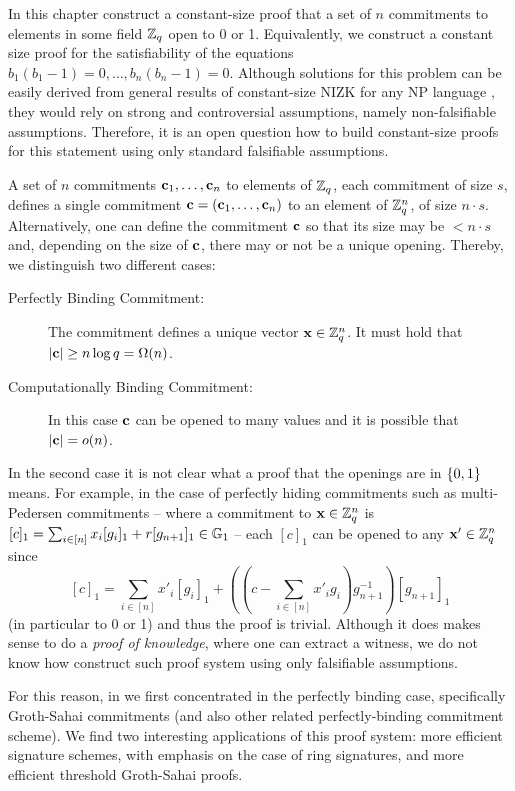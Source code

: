 In this chapter construct a {constant-size proof} that a set of $n$ commitments to elements in some field $\mathbb{Z}_q$ open to 0 or 1. Equivalently, we construct a constant size proof for the satisfiability of the equations $b_1(b_1-1)=0,\ldots,b_n(b_n-1)=0$.
Although solutions for this problem can be easily derived from general results of constant-size NIZK for any NP language \cite{EC:GGPR13,AC:DFGK14,EC:Groth16}, they would rely on strong and controversial assumptions, namely non-falsifiable assumptions. Therefore, it is an open question how to build constant-size proofs for this statement using only standard falsifiable assumptions. 

A set of $n$ commitments $\mathbf{c}_1,\ldots,\mathbf{c}_n$ to elements of $\mathbb{Z}_q$, each commitment of size $s$, defines a single commitment $\mathbf{c}=(\mathbf{c}_1,\ldots,\mathbf{c}_n)$ to an element of $\mathbb{Z}_q^n$, of size $n\cdot s$. Alternatively, one can define the commitment $\mathbf{c}$ so that its size may be $<n\cdot s$ and, depending on the size of $\mathbf{c}$, there may or not be a unique opening. Thereby, we distinguish two different cases:

\begin{description}
\item[Perfectly Binding Commitment:] The commitment defines a unique vector $\mathbf{x}\in\mathbb{Z}_q^n$. It must hold that $|\mathbf{c}|\geq n\log q = \Omega(n)$.
\item[Computationally Binding Commitment:] In this case $\mathbf{c}$ can be opened to many values and it is possible that $|\mathbf{c}|= o(n)$.
\end{description}

In the second case it is not clear what a proof that the openings are in $\{0,1\}$ means. For example, in the case of perfectly hiding commitments such as {multi-Pedersen} commitments -- where a commitment to $\mathbf{x}\in\mathbb{Z}_q^n$ is $[c]_1=\sum_{i\in[n]}x_i[g_i]_1+r[g_{n+1}]_1\in\mathbb{G}_1$ -- each $[c]_1$ can be opened to any $\mathbf{x}'\in\mathbb{Z}_q^n$ since
$$[c]_1=\sum_{i\in[n]}x'_i[g_i]_1+\left(\left(c-\sum_{i\in[n]}x'_ig_i\right)g_{n+1}^{-1}\right)[g_{n+1}]_1$$
(in particular to 0 or 1) and thus the proof is trivial. Although it does makes sense to do a \emph{proof of knowledge}, where one can extract a witness, we do not know how construct such proof system using only falsifiable assumptions.

For this reason, in \cite{AC:GonHevRaf15} we first concentrated in the perfectly binding case, specifically Groth-Sahai commitments (and also other related perfectly-binding commitment scheme). We find two interesting applications of this proof system: more efficient signature schemes, with emphasis on the case of {ring signatures}, and more efficient {threshold Groth-Sahai proofs}.
 
